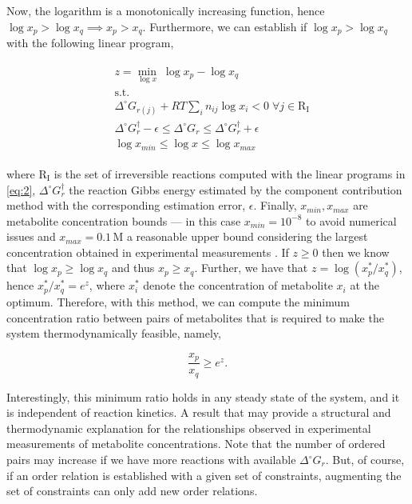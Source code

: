 \documentclass[12pt]{article}
\begin{document}
  Now, the logarithm is a monotonically increasing function, hence $\log{x_p} > \log{x_q} \implies x_p > x_q$. Furthermore, we can establish if $\log{x_p} > \log{x_q}$ with the following linear program,

  \begin{align}
    \begin{aligned}
      \label{eq:5}
      &z = \min_{\log{x}} \; \log{x_p} - \log{x_q}
      \\
      &\mathrm{s.t.}
      \\
      &\Delta^{\circ} G_{r(j)} + RT \sum_i n_{ij} \log{x_i} < 0 \; \forall j \in \mathrm{R_I}
      \\
      &\Delta^{\circ} G_{r}^{\dagger} - \epsilon \leq \Delta^{\circ} G_{r} \leq \Delta^{\circ} G_{r}^{\dagger} + \epsilon
      \\
      &\log{x}_{min} \leq \log{x} \leq \log{x}_{max}
    \end{aligned}
  \end{align}

  \noindent where $\mathrm{R_I}$ is the set of irreversible reactions computed with the linear programs in \ref{eq:2}, $\Delta^{\circ} G_{r}^{\dagger}$ the reaction Gibbs energy estimated by the component contribution method with the corresponding estimation error, $\epsilon$. Finally, $x_{min}, x_{max}$ are metabolite concentration bounds --- in this case $x_{min} = 10^{-8}$ to avoid numerical issues and $x_{max} = 0.1 \,\mathrm{M}$ a reasonable upper bound considering the largest concentration obtained in experimental measurements \cite{Bennett2008}. If $z \geq 0$ then we know that $\log{x_p} \geq \log{x_q}$ and thus $x_p \geq x_q$. Further, we have that $z = \log{(x_p^*/x_q^*)}$, hence $x_p^*/x_q^* = e^z$, where $x_i^*$ denote the concentration of metabolite $x_i$ at the optimum. Therefore, with this method, we can compute the minimum concentration ratio between pairs of metabolites that is required to make the system thermodynamically feasible, namely,

  \begin{equation}
    \label{eq:6}
    \frac{x_p}{x_q} \geq e^z.
  \end{equation}

  Interestingly, this minimum ratio holds in any steady state of the system, and it is independent of reaction kinetics. A result that may provide a structural and thermodynamic explanation for the relationships observed in experimental measurements of metabolite concentrations. Note that the number of ordered pairs may increase if we have more reactions with available $\Delta^{\circ} G_{r}$. But, of course, if an order relation is established with a given set of constraints, augmenting the set of constraints can only add new order relations.






  
\end{document}
